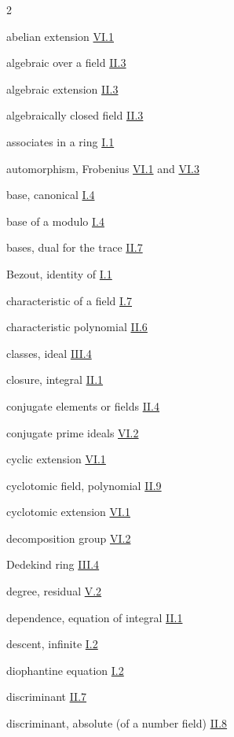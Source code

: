 \begin{multicols}{2}\small
\setlength{\parindent}{0pt}%
\setlength{\parskip}{0.18\baselineskip}%
\raggedright

abelian extension \hyperref[sec:6.1]{VI.1}

algebraic over a field \hyperref[sec:2.3]{II.3}

algebraic extension \hyperref[sec:2.3]{II.3}

algebraically closed field \hyperref[sec:2.3]{II.3}

associates in a ring \hyperref[sec:1.1]{I.1}

automorphism, Frobenius \hyperref[sec:6.1]{VI.1} and \hyperref[sec:6.3]{VI.3}

\medskip
base, canonical \hyperref[sec:1.4]{I.4}

base of a modulo \hyperref[sec:1.4]{I.4}

bases, dual for the trace \hyperref[sec:2.7]{II.7}

Bezout, identity of \hyperref[sec:1.1]{I.1}

\medskip
characteristic of a field \hyperref[sec:1.7]{I.7}

characteristic polynomial \hyperref[sec:2.6]{II.6}

classes, ideal \hyperref[sec:3.4]{III.4}

closure, integral \hyperref[sec:2.1]{II.1}

conjugate elements or fields \hyperref[sec:2.4]{II.4}

conjugate prime ideals \hyperref[sec:6.2]{VI.2}

cyclic extension \hyperref[sec:6.1]{VI.1}

cyclotomic field, polynomial \hyperref[sec:2.9]{II.9}

cyclotomic extension \hyperref[sec:6.1]{VI.1}

\medskip
decomposition group \hyperref[sec:6.2]{VI.2}

Dedekind ring \hyperref[sec:3.4]{III.4}

degree, residual \hyperref[sec:5.2]{V.2}

dependence, equation of integral \hyperref[sec:2.1]{II.1}

descent, infinite \hyperref[sec:1.2]{I.2}

diophantine equation \hyperref[sec:1.2]{I.2}

discriminant \hyperref[sec:2.7]{II.7}

discriminant, absolute (of a number field) \hyperref[sec:2.8]{II.8}


\end{multicols}
